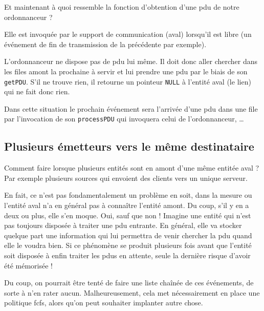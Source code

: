    Et maintenant à quoi ressemble la fonction d'obtention d'une {\sc
 pdu} de notre ordonnanceur ?

   Elle est invoquée par le support de communication (aval) lorsqu'il
est libre (un événement de fin de transmission de la précédente par
exemple).

   L'ordonnanceur ne dispose pas de {\sc pdu} lui même. Il doit donc
aller chercher dans les files amont la prochaine à servir et lui
prendre une {\sc pdu} par le biais de son \lstinline!getPDU!. S'il ne
trouve rien, il retourne un pointeur \lstinline!NULL! à l'entité aval
(le lien) qui ne fait donc rien.

   Dans cette situation le prochain événement sera l'arrivée d'une
{\sc pdu} dans une file par l'invocation de son \lstinline!processPDU!
qui invoquera celui de l'ordonnanceur, \ldots

%
\subsection{Plusieurs émetteurs vers le même destinataire}

   Comment faire lorsque plusieurs entités sont en amont d'une même
entitée aval ? Par exemple plusieurs sources qui envoient des clients
vers un unique serveur.

   En fait, ce n'est pas fondamentalement un problème en soit, dans la
mesure ou l'entité aval n'a en général pas à connaître l'entité
amont. Du coup, s'il y en a deux ou plus, elle s'en moque. Oui, sauf
que non ! Imagine une entité qui n'est pas toujours disposée à traiter
une {\sc pdu} entrante. En général, elle va stocker quelque part une
information qui lui permettra de venir chercher la {\sc pdu} quand
elle le voudra bien. Si ce phénomène se produit plusieurs fois avant
que l'entité soit disposée à enfin traiter les {\sc pdu}s en attente,
seule la dernière risque d'avoir été mémorisée !

   Du coup, on pourrait être tenté de faire une liste chaînée de ces 
événements, de sorte à n'en rater aucun. Malheureusement, cela met
nécessairement en place une politique {\sc fcfs}, alors qu'on peut
souhaiter implanter autre chose.

